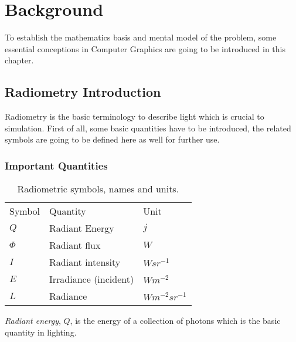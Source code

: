 \chapter{Background}


To establish the mathematics basis and mental model of the problem, some essential conceptions in Computer Graphics are going to be introduced in this chapter.  


\section{Radiometry Introduction}
Radiometry is the basic terminology to describe light which is crucial to simulation. First of all, some basic quantities have to be introduced, the related symbols are going to be defined here as well for further use.

\subsection{Important Quantities} 

\begin{table}[!ht]
\begin{center}
	\begin{tabular}{ | l | l | l |}     	
	\hline 

	Symbol & Quantity & Unit \\

	\(Q\) 			& 		Radiant Energy 				& 		\(j\) \\ 
	\(\Phi\) 			& 		Radiant flux 					& 		\(W\) \\ 
	\(I\) 			& 		Radiant intensity 				& 		\(W sr^{-1}\) \\
	\(E\)			&		Irradiance (incident) 			&		\(W m^{-2}\) \\  
	\(L\)			&		Radiance						&		\(W m^{-2} sr^{-1}\) \\ 
	
	\hline

	\end{tabular}
\end{center} 
\caption{Radiometric symbols, names and units.}
\label{tab:radiometry_quantities}
\end{table}

\emph{Radiant energy}, \(Q\), is the energy of a collection of photons which is the basic quantity in lighting. 

